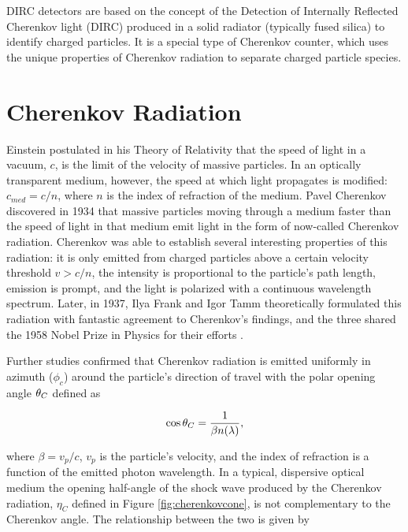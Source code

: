 \label{ch:dirc}
DIRC detectors are based on the concept of the Detection of Internally Reflected Cherenkov light (DIRC) produced in a solid radiator (typically fused silica) to identify charged particles. It is a special type of Cherenkov counter, which uses the unique properties of Cherenkov radiation to separate charged particle species.

\section{Cherenkov Radiation}
Einstein postulated in his Theory of Relativity that the speed of light in a vacuum, $c$, is the limit of the velocity of massive particles. In an optically transparent medium, however, the speed at which light propagates is modified: $c_{med} = c/n$, where $n$ is the index of refraction of the medium. Pavel Cherenkov discovered in 1934 that massive particles moving through a medium faster than the speed of light in that medium emit light in the form of now-called Cherenkov radiation. Cherenkov was able to establish several interesting properties of this radiation: it is only emitted from charged particles above a certain velocity threshold $v > c/n$, the intensity is proportional to the particle's path length, emission is prompt, and the light is polarized with a continuous wavelength spectrum. Later, in 1937, Ilya Frank and Igor Tamm theoretically formulated this radiation with fantastic agreement to Cherenkov's findings, and the three shared the 1958 Nobel Prize in Physics for their efforts \cite{CherenkovHistory}.

Further studies confirmed that Cherenkov radiation is emitted uniformly in azimuth ($\phi_c$) around the particle's direction of travel with the polar opening angle $\theta_{C}$ defined as

\begin{equation}
	\cos\theta_{C} = \frac{1}{\beta n(\lambda)},
	\label{eq:cherenkovformula}
\end{equation}

where $\beta = v_p/c$, $v_p$ is the particle's velocity, and the index of refraction is a function of the emitted photon wavelength. In a typical, dispersive optical medium the opening half-angle of the shock wave produced by the Cherenkov radiation, $\eta_C$ defined in Figure \ref{fig:cherenkovcone}, is not complementary to the Cherenkov angle. The relationship between the two is given by

